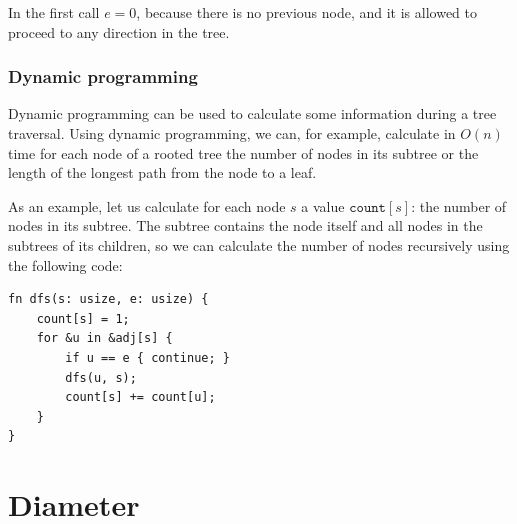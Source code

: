 In the first call $e=0$, because there is no
previous node, and it is allowed
to proceed to any direction in the tree.

\subsubsection{Dynamic programming}

Dynamic programming can be used to calculate
some information during a tree traversal.
Using dynamic programming, we can, for example,
calculate in $O(n)$ time for each node of a rooted tree the
number of nodes in its subtree
or the length of the longest path from the node
to a leaf.

As an example, let us calculate for each node $s$
a value $\texttt{count}[s]$: the number of nodes in its subtree.
The subtree contains the node itself and
all nodes in the subtrees of its children,
so we can calculate the number of nodes
recursively using the following code:

\begin{lstlisting}
fn dfs(s: usize, e: usize) {
    count[s] = 1;
    for &u in &adj[s] {
        if u == e { continue; }
        dfs(u, s);
        count[s] += count[u];
    }
}
\end{lstlisting}

\section{Diameter}


